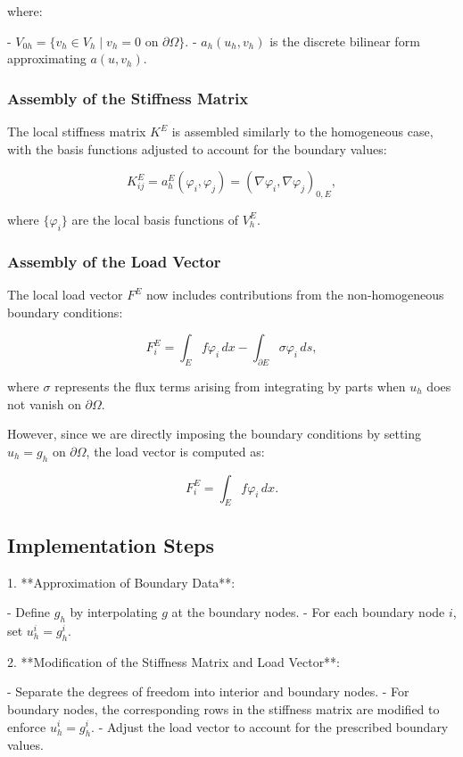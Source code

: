 \documentclass[class=article, crop=false]{standalone}
\begin{document}
where:

- $V_{0h} = \{ v_h \in V_h \mid v_h = 0 \text{ on } \partial \Omega \}$.
- $a_h(u_h, v_h)$ is the discrete bilinear form approximating $a(u, v_h)$.

\subsubsection{Assembly of the Stiffness Matrix}

The local stiffness matrix $K^E$ is assembled similarly to the homogeneous case, with the basis functions adjusted to account for the boundary values:

\[
K^E_{ij} = a_h^E(\varphi_i, \varphi_j) = (\nabla \varphi_i, \nabla \varphi_j)_{0,E},
\]

where $\{ \varphi_i \}$ are the local basis functions of $V_h^E$.

\subsubsection{Assembly of the Load Vector}

The local load vector $F^E$ now includes contributions from the non-homogeneous boundary conditions:

\[
F^E_i = \int_E f \varphi_i \, dx - \int_{\partial E} \sigma \varphi_i \, ds,
\]

where $\sigma$ represents the flux terms arising from integrating by parts when $u_h$ does not vanish on $\partial \Omega$.

However, since we are directly imposing the boundary conditions by setting $u_h = g_h$ on $\partial \Omega$, the load vector is computed as:

\[
F^E_i = \int_E f \varphi_i \, dx.
\]

\subsection{Implementation Steps}

1. **Approximation of Boundary Data**:

   - Define $g_h$ by interpolating $g$ at the boundary nodes.
   - For each boundary node $i$, set $u_h^i = g_h^i$.

2. **Modification of the Stiffness Matrix and Load Vector**:

   - Separate the degrees of freedom into interior and boundary nodes.
   - For boundary nodes, the corresponding rows in the stiffness matrix are modified to enforce $u_h^i = g_h^i$.
   - Adjust the load vector to account for the prescribed boundary values.
\end{document}
